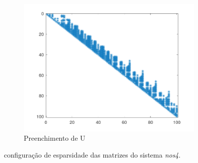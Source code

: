 \documentclass{article}
\begin{document}
\begin{figure}[H]
\begin{subfigure}[b]{0.3\textwidth}
         \centering
         \includegraphics[width=\textwidth]{image/nos4spyU.png}
         \caption{Preenchimento de U}
         \label{fig:nos4-spyU}
    \end{subfigure}
    \hfill
    \caption{configuração de esparsidade das matrizes do sistema \textit{nos4}.}
    \label{fig:nos4}
\end{figure}
\end{document}
